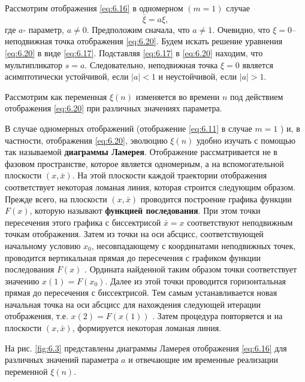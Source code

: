 Рассмотрим отображения \eqref{eq:6.16} в одномерном $(m=1)$ случае 
\begin{equation}
        \label{eq:6.20}
        \bar{\xi} = a \xi, 
\end{equation}
где $a$- параметр, $a\neq 0$. Предположим сначала, что $a \neq 1$. Очевидно, что $\xi=0$--
неподвижная точка отображения \eqref{eq:6.20}. Будем искать решение уравнения \eqref{eq:6.20} в виде \eqref{eq:6.17}. Подставляя \eqref{eq:6.17} в \eqref{eq:6.20} находим, что мультипликатор $s = a$. Следовательно, неподвижная точка $\xi=0$ является асимптотически устойчивой, если
$|a|<1$ и неустойчивой, если $|a|>1$.

Рассмотрим как переменная $\xi(n)$ изменяется во времени $n$ под действием отображения \eqref{eq:6.20} при различных значениях параметра.

В случае одномерных отображений (отображение \eqref{eq:6.11} в случае $m=1$ ) и, в частности, отображения \eqref{eq:6.20}, эволюцию $\xi(n)$ удобно изучать с помощью так называемой 
\textbf{диаграммы Ламерея}. 
 Отображение рассматривается не в фазовом
пространстве, которое является одномерным, а на вспомогательной плоскости
$(x,\bar x)$. На этой плоскости каждой траектории отображения соответствует
некоторая ломаная линия, которая строится следующим образом. Прежде всего,
на плоскости $(x,\bar x)$ проводится построение графика функции $F(x)$, которую
называют \textbf{функцией последования}. При этом точки пересечения этого графика
с биссектрисой $\bar x = x$ соответствуют неподвижным точкам отображения. Затем
из точки на оси абсцисс, соответствующей начальному условию
$x_0$,
несовпадающему с координатами неподвижных точек, проводится
вертикальная прямая до пересечения с графиком функции последования $F(x)$ .
Ордината найденной таким образом точки соответствует значению 
$x(1) = F(x_0)$.
Далее из этой точки проводится горизонтальная прямая до пересечения с
биссектрисой. Тем самым устанавливается новая начальная точка на оси
абсцисс для нахождения следующей итерации отображения, т.е.  $x(2)=F(x(1))$ .
Затем процедура повторяется и на плоскости $(x,\bar x)$, формируется некоторая
ломаная линия.

На рис. \ref{fig:6.3} представлены диаграммы Ламерея отображения \eqref{eq:6.16} для
различных значений параметра $a$ и отвечающие им временные реализации
переменной  $\xi(n)$.

